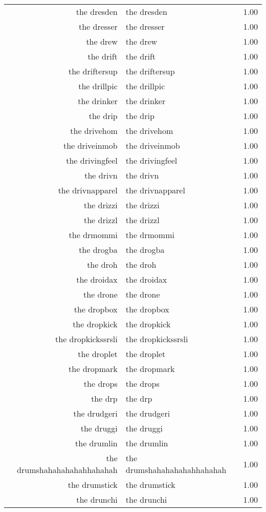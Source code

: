 \begin{table}[ht]
\begin{tabular}{rlr}
  the dresden & the dresden & 1.00 \\ 
  the dresser & the dresser & 1.00 \\ 
  the drew & the drew & 1.00 \\ 
  the drift & the drift & 1.00 \\ 
  the driftersup & the driftersup & 1.00 \\ 
  the drillpic & the drillpic & 1.00 \\ 
  the drinker & the drinker & 1.00 \\ 
  the drip & the drip & 1.00 \\ 
  the drivehom & the drivehom & 1.00 \\ 
  the driveinmob & the driveinmob & 1.00 \\ 
  the drivingfeel & the drivingfeel & 1.00 \\ 
  the drivn & the drivn & 1.00 \\ 
  the drivnapparel & the drivnapparel & 1.00 \\ 
  the drizzi & the drizzi & 1.00 \\ 
  the drizzl & the drizzl & 1.00 \\ 
  the drmommi & the drmommi & 1.00 \\ 
  the drogba & the drogba & 1.00 \\ 
  the droh & the droh & 1.00 \\ 
  the droidax & the droidax & 1.00 \\ 
  the drone & the drone & 1.00 \\ 
  the dropbox & the dropbox & 1.00 \\ 
  the dropkick & the dropkick & 1.00 \\ 
  the dropkickssrsli & the dropkickssrsli & 1.00 \\ 
  the droplet & the droplet & 1.00 \\ 
  the dropmark & the dropmark & 1.00 \\ 
  the drops & the drops & 1.00 \\ 
  the drp & the drp & 1.00 \\ 
  the drudgeri & the drudgeri & 1.00 \\ 
  the druggi & the druggi & 1.00 \\ 
  the drumlin & the drumlin & 1.00 \\ 
  the drumshahahahahahhahahah & the drumshahahahahahhahahah & 1.00 \\ 
  the drumstick & the drumstick & 1.00 \\ 
  the drunchi & the drunchi & 1.00 \\ 

\end{tabular}
\end{table}
